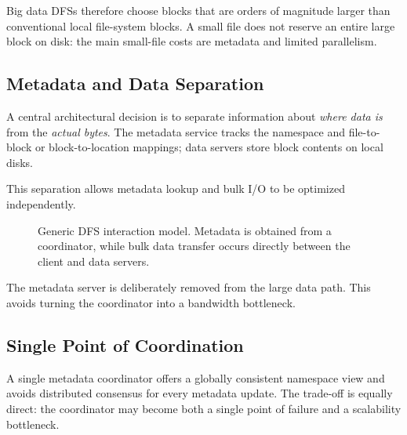 \documentclass[11pt,a4paper,oneside]{book}
\begin{document}
Big data DFSs therefore choose blocks that are orders of magnitude larger than conventional local file-system blocks. A small file does not reserve an entire large block on disk: the main small-file costs are metadata and limited parallelism.

\subsection{Metadata and Data Separation}

A central architectural decision is to separate information about \emph{where data is} from the \emph{actual bytes}. The metadata service tracks the namespace and file-to-block or block-to-location mappings; data servers store block contents on local disks.

This separation allows metadata lookup and bulk I/O to be optimized independently.

\begin{figure}[htbp]
\centering
{}
\caption{Generic DFS interaction model. Metadata is obtained from a coordinator, while bulk data transfer occurs directly between the client and data servers.}
\label{fig:generic-dfs}
\end{figure}

The metadata server is deliberately removed from the large data path. This avoids turning the coordinator into a bandwidth bottleneck.

\subsection{Single Point of Coordination}

A single metadata coordinator offers a globally consistent namespace view and avoids distributed consensus for every metadata update. The trade-off is equally direct: the coordinator may become both a single point of failure and a scalability bottleneck.
\end{document}
